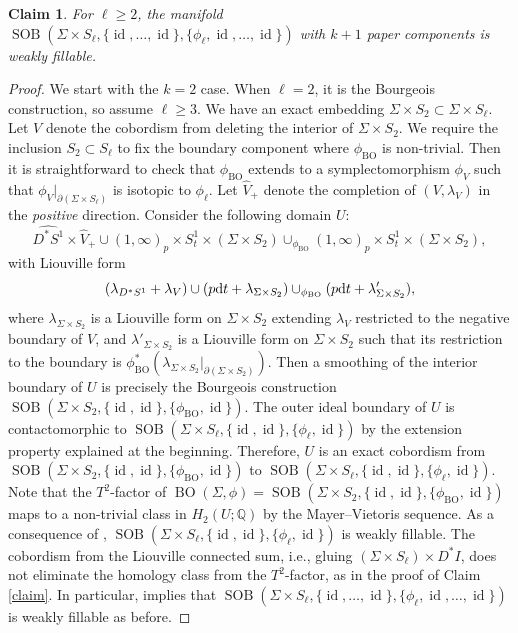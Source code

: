 \documentclass[11pt]{amsart}
\numberwithin{equation}{section}
\newtheorem{claim}[theorem]{\textbf{Claim}}
\def\Q{{\mathbb Q}}
\def\rd{{\rm d}}
\DeclareMathOperator{\Id}{id}
\DeclareMathOperator{\BO}{BO}
\DeclareMathOperator{\SOB}{SOB}
\begin{document}
\begin{claim}
     For $\ell\ge 2$, the manifold $\SOB(\Sigma \times S_{\ell}, \{\Id,\ldots,\Id\}, \{\phi_{\ell},\Id,\ldots,\Id\})$ with $k+1$ paper components is weakly fillable. 
\end{claim}
\begin{proof}
We start with the $k=2$ case. When $\ell=2$, it is the Bourgeois construction, so assume $\ell\ge 3$. We have an exact embedding $\Sigma \times S_2\subset \Sigma \times S_{\ell}$. Let $V$ denote the cobordism from deleting the interior of $\Sigma \times S_2$. We require the inclusion $S_2\subset S_{\ell}$ to fix the boundary component where $\phi_{\BO}$ is non-trivial. Then it is straightforward to check that $\phi_{\BO}$ extends to a symplectomorphism $\phi_V$ such that $\phi_V|_{\partial(\Sigma\times S_{\ell})}$ is isotopic to $\phi_{\ell}$. Let $\widehat{V}_+$ denote the completion of $(V,\lambda_V)$ in the \emph{positive} direction. Consider the following domain $U$:
$$\widehat{D^*S^1}\times \widehat{V}_+ \cup (1,\infty)_p \times S^1_t \times (\Sigma\times S_2) \cup_{\phi_{\BO}} (1,\infty)_p \times S^1_t \times (\Sigma\times S_2),$$
with Liouville form
$$(\lambda_{D^*S^1}+\lambda_V)\cup (p\rd t + \lambda_{\Sigma\times S_2})\cup_{\phi_{\BO}}(p\rd t +\lambda'_{\Sigma\times S_2}),$$
where $\lambda_{\Sigma\times S_2}$ is a Liouville form on $\Sigma \times S_2$ extending $\lambda_V$ restricted to the negative boundary of $V$, and $\lambda'_{\Sigma\times S_2}$ is a Liouville form on $\Sigma \times S_2$ such that its restriction to the boundary is $\phi_{\BO}^*(\lambda_{\Sigma \times S_2}|_{\partial(\Sigma \times S_2)})$. Then a smoothing of the interior boundary of $U$ is precisely the Bourgeois construction $\SOB(\Sigma \times S_{2}, \{\Id,\Id\}, \{\phi_{\BO},\Id\})$. The outer ideal boundary of $U$ is contactomorphic to $\SOB(\Sigma \times S_{\ell}, \{\Id,\Id\}, \{\phi_{\ell},\Id\})$ by the extension property explained at the beginning. Therefore, $U$ is an exact cobordism from $\SOB(\Sigma \times S_{2}, \{\Id,\Id\}, \{\phi_{\BO},\Id\})$ to $\SOB(\Sigma \times S_{\ell}, \{\Id,\Id\}, \{\phi_{\ell},\Id\})$. Note that the $T^2$-factor of $\BO(\Sigma,\phi)=\SOB(\Sigma \times S_{2}, \{\Id,\Id\}, \{\phi_{\BO},\Id\})$ maps to a non-trivial class in $H_2(U;\Q)$ by the Mayer–Vietoris sequence. As a consequence of , $\SOB(\Sigma \times S_{\ell}, \{\Id,\Id\}, \{\phi_{\ell},\Id\})$ is weakly fillable. The cobordism from the Liouville connected sum, i.e., gluing $(\Sigma \times S_{\ell})\times D^*I$, does not eliminate the homology class from the $T^2$-factor, as in the proof of Claim \ref{claim}. In particular,  implies that $\SOB(\Sigma \times S_{\ell}, \{\Id,\ldots,\Id\}, \{\phi_{\ell},\Id,\ldots,\Id\})$ is weakly fillable as before.
\end{proof}
\end{document}
